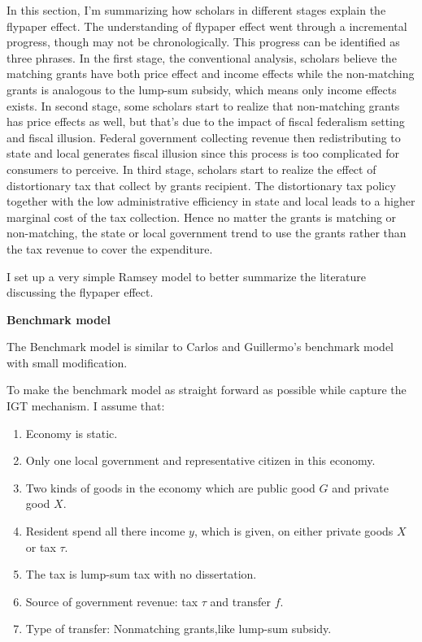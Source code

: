 In this section, I'm summarizing how scholars in different stages explain the flypaper effect. The understanding of flypaper effect went through a incremental progress, though may not be chronologically. This progress can be identified as three phrases. In the first stage, the conventional analysis, scholars believe the matching grants have both price effect and income effects while the non-matching grants is analogous to the lump-sum subsidy, which means only income effects exists. In second stage, some scholars start to realize that non-matching grants has price effects as well, but that's due to the impact of fiscal federalism setting and fiscal illusion. Federal government collecting revenue then redistributing to state and local generates fiscal illusion since this process is too complicated for consumers to perceive. In third stage, scholars start to realize the effect of distortionary tax that collect by grants recipient. The distortionary tax policy together with the low administrative efficiency in state and local leads to a higher marginal cost of the tax collection. Hence no matter the grants is matching or non-matching, the state or local government trend to use the grants rather than the tax revenue to cover the expenditure.

I set up a very simple Ramsey model to better summarize the literature discussing the flypaper effect.

\textbf{Benchmark model}

The Benchmark model is similar to Carlos and Guillermo's \cite{vegh2016unsticking} benchmark model with small modification.

To make the benchmark model as straight forward as possible while capture the IGT mechanism. I assume that:

\begin{enumerate}
    \item Economy is static.
    \item Only one local government and representative citizen in this economy.
    \item Two kinds of goods in the economy which are public good $G$ \label{G} and private good $X$.\label{X}
    \item Resident spend all there income $y$, which is given, on either private goods $X$ or tax $\tau$.\label{y}
    \item The tax is lump-sum tax with no dissertation.
    \item Source of government revenue: tax $\tau$ and transfer $f$.\label{f}
    \item Type of transfer: Nonmatching grants,like lump-sum subsidy.
\end{enumerate}

